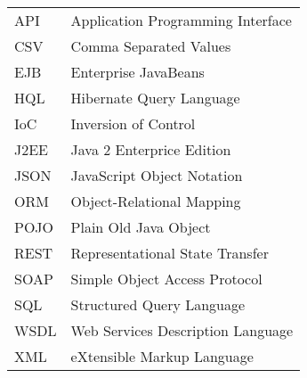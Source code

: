 
\seznamzkr

\begin{tabular}{ll}
  API	& Application Programming Interface	\\
  CSV	& Comma Separated Values			\\
  EJB	& Enterprise JavaBeans				\\
  HQL	& Hibernate Query Language			\\
  IoC	& Inversion of Control				\\
  J2EE	& Java 2 Enterprice Edition			\\
  JSON	& JavaScript Object Notation		\\
  ORM	& Object-Relational Mapping			\\
  POJO	& Plain Old Java Object				\\
  REST	& Representational State Transfer	\\
  SOAP	& Simple Object Access Protocol 	\\
  SQL	& Structured Query Language		 	\\
  WSDL	& Web Services Description Language	\\
  XML	& eXtensible Markup Language		\\
\end{tabular}

